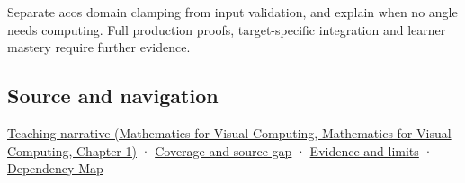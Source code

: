 Separate acos domain clamping from input validation, and explain when no angle needs computing. Full production proofs, target-specific integration and learner mastery require further evidence.

\subsection{Source and navigation}\label{appendix-e569e60e18e6-source-and-navigation}

\href{../02-Mathematics-for-Visual-Computing/main.pdf\#nameddest=01-foundations-i-ch017-an-angle-is-a-question-with-a-domain}{Teaching narrative (Mathematics for Visual Computing, Mathematics for Visual Computing, Chapter 1)} · \hyperref[appendix-fd090d982a15-phase-6---parts-501-600]{Coverage and source gap} · \hyperref[appendix-a103e7846d21-phase-6---source-analysis-and-verification]{Evidence and limits} · \hyperref[appendix-4ad47bdd269a]{Dependency Map}
